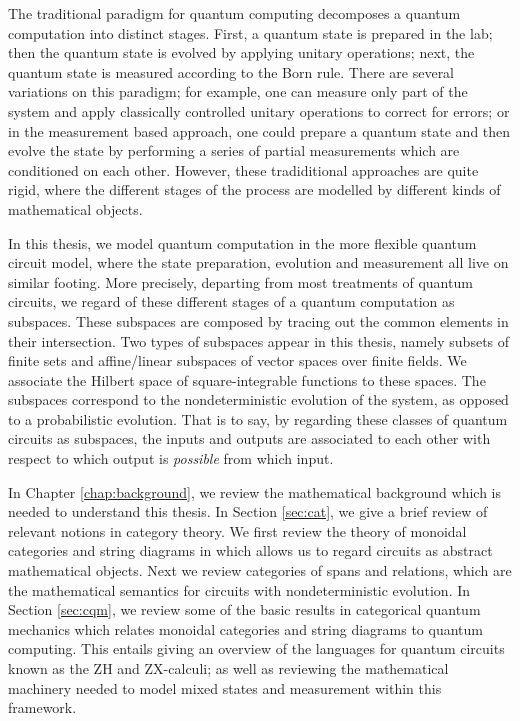 \documentclass[12pt]{ociamthesis}  %
\begin{document}
The traditional paradigm for quantum computing decomposes a quantum computation into  distinct stages. First, a quantum state is prepared in the lab; then the quantum state is evolved by applying unitary operations; next, the quantum state is measured according to the Born rule.  There are several variations on this paradigm; for example,  one can measure only part of the system and apply classically controlled unitary operations to correct for errors; or in the measurement based approach, one could prepare a quantum state and then evolve the state by performing a series of partial measurements which are conditioned on each other. However, these tradiditional approaches are quite rigid, where the different stages of the process are modelled by different kinds of mathematical objects.  %

In this thesis, we model quantum computation in the more flexible quantum circuit model, where the state preparation, evolution and measurement all live on similar footing.  More precisely, departing from most treatments of quantum circuits, we regard of these different stages of a quantum computation as subspaces. These subspaces are composed by tracing out the common elements in their intersection.  Two types of subspaces appear in this thesis, namely subsets of finite sets and affine/linear subspaces of vector spaces over finite fields.  We associate the Hilbert space of square-integrable functions to these spaces. The subspaces correspond to the nondeterministic evolution of the system, as opposed to a probabilistic evolution.  That is to say, by regarding these classes of quantum circuits as subspaces, the inputs and outputs are associated to each other with respect to which output is {\em possible} from which input.

In Chapter \ref{chap:background}, we review the mathematical background which is needed to understand this thesis.  In Section \ref{sec:cat}, we give a brief review of relevant notions in category theory.  We first review the theory of monoidal categories and string diagrams in which allows us to regard circuits as abstract mathematical objects.  Next we review categories of spans and relations, which are the mathematical semantics for circuits with nondeterministic evolution.  In Section \ref{sec:cqm}, we review some of the basic results in categorical quantum mechanics which relates monoidal categories and string diagrams to quantum computing. This entails giving an overview of the languages for quantum circuits known as the  ZH and ZX-calculi; as well as reviewing the mathematical machinery needed to model mixed states and measurement within this framework.
\end{document}
